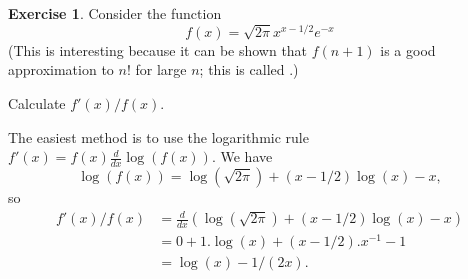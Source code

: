\documentclass[a4paper]{book}
\theoremstyle{definition}
\newtheorem{exercise}[theorem]{Exercise}
\renewenvironment{solution}{\SolutionInline}{\endSolutionInline}
\begin{document}
\begin{exercise}
 Consider the function 
 \[ f(x) = \sqrt{2\pi} x^{x-1/2} e^{-x} \]
 (This is interesting because it can be shown that $f(n+1)$ is a good
 approximation to $n!$ for large $n$; this is called  .)

 Calculate $f'(x)/f(x)$.
\end{exercise}
\begin{solution}
 The easiest method is to use the logarithmic rule 
 $f'(x)=f(x)\frac{d}{dx}\log(f(x))$.  We have
 \[ \log(f(x)) = \log(\sqrt{2\pi}) + (x-1/2)\log(x) - x, \]
 so
 \begin{align*}
  f'(x)/f(x)
   &= \frac{d}{dx}(\log(\sqrt{2\pi}) + (x-1/2)\log(x) - x) \\
   &= 0 + 1.\log(x) + (x-1/2).x^{-1} - 1 \\
   &= \log(x) - 1/(2x).
 \end{align*}
\end{solution}
\end{document}
